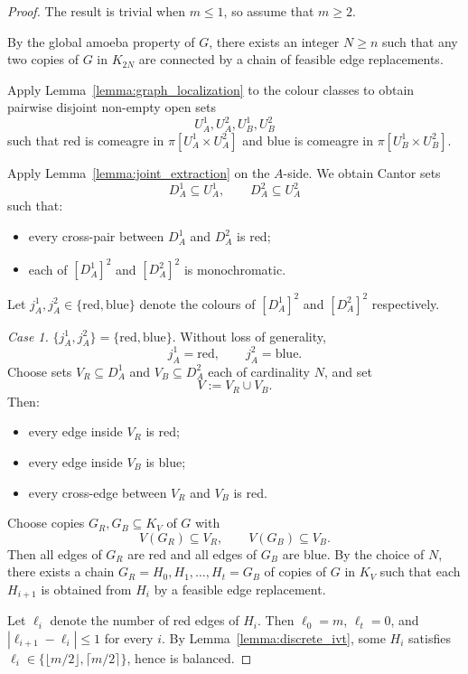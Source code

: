 \begin{proof}
    The result is trivial when $m\leq 1$, so assume that $m\geq 2$.
 
    By the global amoeba property of $G$, there exists an integer $N\geq n$ such that any two copies of $G$ in $K_{2N}$ are connected by a chain of feasible edge replacements.
 
    Apply Lemma~\ref{lemma:graph_localization} to the colour classes to obtain pairwise disjoint non-empty open sets $$U_A^1,U_A^2,U_B^1,U_B^2$$ such that red is comeagre in $\pi[U_A^1\times U_A^2]$ and blue is comeagre in $\pi[U_B^1\times U_B^2]$.
    
    Apply Lemma~\ref{lemma:joint_extraction} on the $A$-side.
    We obtain Cantor sets $$D_A^1\subseteq U_A^1,\qquad D_A^2\subseteq U_A^2$$ such that:
    \begin{itemize}
        \item every cross-pair between $D_A^1$ and $D_A^2$ is red;
        \item each of $[D_A^1]^2$ and $[D_A^2]^2$ is monochromatic.
    \end{itemize}
 
    Let $j_A^1,j_A^2\in\{\mathrm{red},\mathrm{blue}\}$ denote the colours of $[D_A^1]^2$ and $[D_A^2]^2$ respectively.
 
    \medskip
 
    \noindent\textit{Case 1.}
    $\{j_A^1,j_A^2\}=\{\mathrm{red},\mathrm{blue}\}$.
    Without loss of generality, $$j_A^1=\mathrm{red},\qquad j_A^2=\mathrm{blue}.$$
    Choose sets $V_R\subseteq D_A^1$ and $V_B\subseteq D_A^2$ each of cardinality $N$, and set $$V:=V_R\cup V_B.$$
    Then:
    \begin{itemize}
        \item every edge inside $V_R$ is red;
        \item every edge inside $V_B$ is blue;
        \item every cross-edge between $V_R$ and $V_B$ is red.
    \end{itemize}
 
    Choose copies $G_R,G_B\subseteq K_V$ of $G$ with $$V(G_R)\subseteq V_R,\qquad V(G_B)\subseteq V_B.$$
    Then all edges of $G_R$ are red and all edges of $G_B$ are blue.
    By the choice of $N$, there exists a chain $G_R=H_0,H_1,\dots,H_t=G_B$ of copies of $G$ in $K_V$ such that each $H_{i+1}$ is obtained from $H_i$ by a feasible edge replacement.
 
    Let $\ell_i$ denote the number of red edges of $H_i$.
    Then $\ell_0=m$, $\ell_t=0$, and $|\ell_{i+1}-\ell_i|\leq 1$ for every $i$.
    By Lemma~\ref{lemma:discrete_ivt}, some $H_i$ satisfies $\ell_i\in\{\lfloor m/2\rfloor,\lceil m/2\rceil\}$, hence is balanced.
 

\end{proof}
